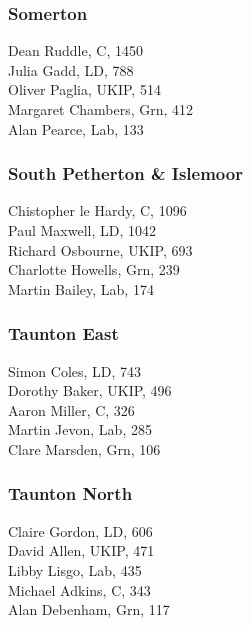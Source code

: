 \documentclass[a4paper,openany,10pt]{book}
\begin{document}
\subsubsection*{Somerton}



Dean Ruddle, C, 1450\\
Julia Gadd, LD, 788\\
Oliver Paglia, UKIP, 514\\
Margaret Chambers, Grn, 412\\
Alan Pearce, Lab, 133\\


\subsubsection*{South Petherton \& Islemoor}



Chistopher le Hardy, C, 1096\\
Paul Maxwell, LD, 1042\\
Richard Osbourne, UKIP, 693\\
Charlotte Howells, Grn, 239\\
Martin Bailey, Lab, 174\\


\subsubsection*{Taunton East}



Simon Coles, LD, 743\\
Dorothy Baker, UKIP, 496\\
Aaron Miller, C, 326\\
Martin Jevon, Lab, 285\\
Clare Marsden, Grn, 106\\


\subsubsection*{Taunton North}



Claire Gordon, LD, 606\\
David Allen, UKIP, 471\\
Libby Lisgo, Lab, 435\\
Michael Adkins, C, 343\\
Alan Debenham, Grn, 117\\
\end{document}
